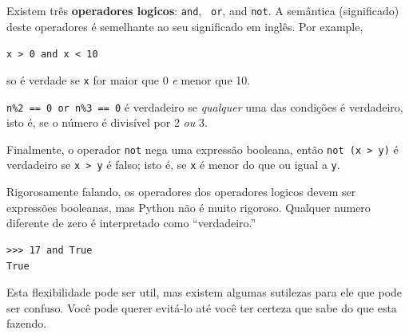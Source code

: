 Existem três {\bf operadores logicos}: {\tt and}, {\tt
or}, and {\tt not}.  A semântica (significado) deste operadores é
semelhante ao seu significado em inglês.  Por example,


{\tt x > 0 and x < 10} 

so é verdade se {\tt x} for maior que 0
\emph{e} menor que 10.




{\tt n\%2 == 0 or n\%3 == 0} é verdadeiro se \emph{qualquer} uma das condições
é verdadeiro, isto é, se o número é divisível por 2 \emph{ou} 3.


Finalmente, o operador {\tt not} nega uma expressão
booleana, então {\tt not (x > y)} é verdadeiro se {\tt x > y} é falso;
isto é, se {\tt x} é menor do que ou igual a {\tt y}.


Rigorosamente falando, os operadores dos operadores logicos devem ser
expressões booleanas, mas Python não é muito rigoroso.
Qualquer numero diferente de zero é interpretado como ``verdadeiro.''


\beforeverb
\begin{verbatim}
>>> 17 and True
True
\end{verbatim}
\afterverb
%
Esta flexibilidade pode ser util, mas existem algumas sutilezas para
ele que pode ser confuso. Você pode querer evitá-lo até
você ter certeza que sabe do que esta fazendo.

